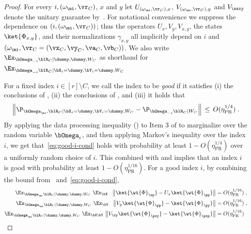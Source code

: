 \begin{proof}
	For every $i,(\omega_{\mi}, \vr_C)$, $x$ and $y$ let $U_{(\omega_{\mi}, \vr_C), x}$, $V_{(\omega_{\mi}, \vr_C), y}$ and $V_{\ssxy}$ denote the unitary guarantee by~. For notational convenience we suppress the dependence on $(i, (\omega_{\mi}, \vr_C))$; thus the operators $U_x, V_y, V_{x,y}$, the states $\ket{\Phi_{x,y}}$, and their normalizations $\gamma_{x,y}$ all implicitly depend on $i$ and $(\omega_{\mi}, \vr_C = (\vx_C, \vy_C, \va_C, \vb_C))$. We also write $\Ex_{\bOmega_{-i} \blR_C| \dummy, \dummy, W_C}$ as shorthand for $\Ex_{\bOmega_{-i} \blR_C| \bX_i = \dummy, \bY_i = \dummy, W_C}$
	
	For a fixed index $i \in [r] \setminus C$, we call the index to be \emph{good} if it satisfies (i) the conclusions of , (ii) the conclusions of , and (iii) it holds that
	\begin{equation}\label{eq:good-i-cond}
		\left \| \P_{\bOmega_{\mi}, \blR_C | \bX_i = \dummy, \bY_i = \dummy,W_C} - \P_{\bOmega_{-i} \blR_C | W_C} \right \| \,\leq\, O(\eta_{\text{PR}}^{1/4})\;.
	\end{equation}
	By applying the data processing inequality () to Item 3 of  to marginalize over the random variable $\bOmega_i$, and then applying Markov's inequality over the index $i$, we get that~\eqref{eq:good-i-cond} holds with probability at least $1 - O(\eta_{\text{PR}}^{1/4})$ over a uniformly random choice of $i$. This combined with  and  implies that an index $i$ is good with probability at least $1 - O(\eta_{\text{PR}}^{1/16})$. 
	For a good index $i$, by combining the bound from~ and~\eqref{eq:good-i-cond}, 
	\begin{align}
		\Ex_{\bOmega_{\mi} \blR_C | \dummy,\dummy,W_C} \,\, \Ex_{\bX} \,\, \,\,\, \big \| \ket{\wt{\Phi}_\xp } - U_{x}  \ket{\wt{\Phi}_\pp}  \big \| &=  O(\eta_{\text{PR}}^{1/16})\;,\label{eq:ux_bound-2}\\
		\Ex_{\bOmega_{\mi} \blR_C | \dummy,\dummy,W_C} \,\, \Ex_{\bY} \,\, \,\,\, \big \| V_y  \ket{\wt{\Phi}_\pp}  - \ket{\wt{\Phi}_\py }  \big \| &=  O(\eta_{\text{PR}}^{1/16})\;,\label{eq:vy_bound-2}\\
		\Ex_{\bOmega_{\mi} \blR_C | \dummy,\dummy,W_C} \,\, \Ex_{\bX \bY} \,\,  \big \|  V_\xy  \ket{\wt{\Phi}_\pxy}  - \ket{\wt{\Phi}_\pxp }  \big \| &=  O(\eta_{\text{PR}}^{1/16}) \label{eq:vxy_bound-2}

\end{align}
\end{proof}
